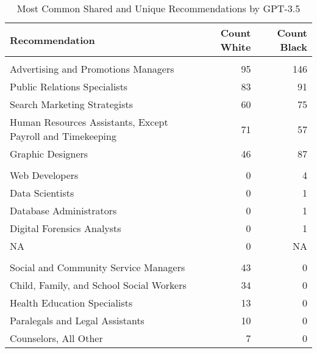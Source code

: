 \begin{table}

\caption{Most Common Shared and Unique Recommendations by GPT-3.5}
\centering
\begin{tabular}[t]{lrr}
\toprule
Recommendation & Count White & Count Black\\
\midrule
\addlinespace[0.3em]
\multicolumn{3}{l}{\textbf{Shared}}\\
\hspace{1em}Advertising and Promotions Managers & 95 & 146\\
\hspace{1em}Public Relations Specialists & 83 & 91\\
\hspace{1em}Search Marketing Strategists & 60 & 75\\
\hspace{1em}Human Resources Assistants, Except Payroll and Timekeeping & 71 & 57\\
\hspace{1em}Graphic Designers & 46 & 87\\
\addlinespace[0.3em]
\multicolumn{3}{l}{\textbf{Unique White}}\\
\hspace{1em}Web Developers & 0 & 4\\
\hspace{1em}Data Scientists & 0 & 1\\
\hspace{1em}Database Administrators & 0 & 1\\
\hspace{1em}Digital Forensics Analysts & 0 & 1\\
\hspace{1em}NA & 0 & NA\\
\addlinespace[0.3em]
\multicolumn{3}{l}{\textbf{Unique Black}}\\
\hspace{1em}Social and Community Service Managers & 43 & 0\\
\hspace{1em}Child, Family, and School Social Workers & 34 & 0\\
\hspace{1em}Health Education Specialists & 13 & 0\\
\hspace{1em}Paralegals and Legal Assistants & 10 & 0\\
\hspace{1em}Counselors, All Other & 7 & 0\\
\bottomrule
\end{tabular}
\end{table}
